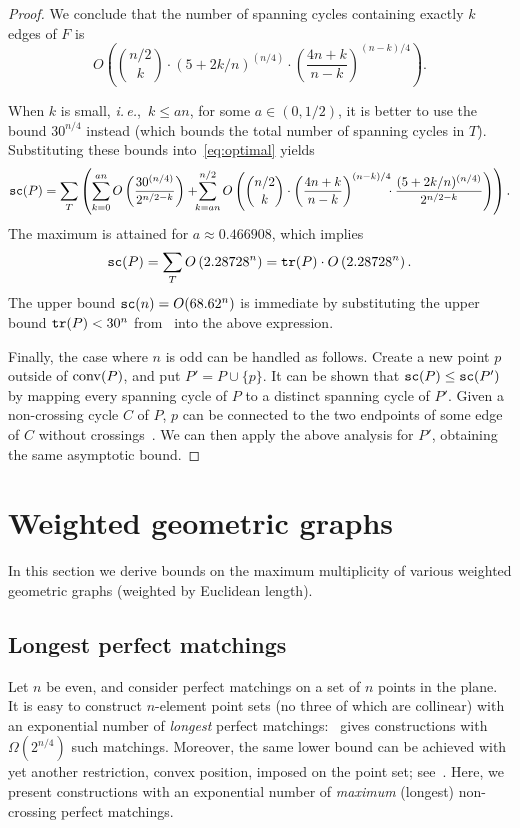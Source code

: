 \documentclass[11pt]{article}
\def\ie{{\it i.\,e.},~}
\newcommand{\conv}{{\rm conv}}
\def\tr{{\tt tr}}
\def\sc{{\tt sc}}
\def\ns{\hspace*{-1ex}}
\begin{document}
\begin{proof}
We conclude that the number of spanning cycles containing exactly $k$
edges of $F$ is
\begin{equation*} \label{eq:countK}
O \left(\binom{n/2}{k} \cdot (5+2k/n)^{(n/4)} \cdot \left(
\frac{4n+k}{n-k} \right)^{(n-k)/4} \right).
\end{equation*}

When $k$ is small, \ie $k \leq an$, for some $a \in (0,1/2)$, it is
better to use the bound $30^{n/4}$ instead
(which bounds the total number of spanning cycles in $T$).
Substituting these bounds into~\eqref{eq:optimal} yields
\[ \sc(P) = \sum_{T} \left( \sum_{k = 0}^{an} O \left(
\frac{30^{(n/4)}}{2^{n/2-k}}\right) + \ns  \sum_{k = an}^{n/2}O \left(
\binom{n/2}{k} \cdot \left( \frac{4n+k}{n-k} \right)^{(n-k)/4} \ns
\cdot  \frac{(5+2k/n)^{(n/4)}}{2^{n/2-k}} \right) \right). \]
The maximum is attained for $a \approx 0.466908$, which implies
\[ \sc(P) = \sum_{T} O\left(2.28728^n \right) = \tr(P) \cdot O\left(2.28728^n \right). \]
The upper bound $\sc(n) = O(68.62^n)$ is immediate by substituting
the upper bound $\tr(P)<30^n$ from~\cite{SS10} into the above expression.

Finally, the case where $n$ is odd can be handled as follows. Create a new point $p$
outside of $\conv(P)$, and put $P' = P \cup \{p\}$.
It can be shown that $\sc(P) \le \sc(P')$ by mapping every spanning cycle of $P$ to
a distinct spanning cycle of $P'$. Given a non-crossing cycle $C$ of $P$,
 $p$ can be connected to the two endpoints of some
edge of $C$ without crossings~\cite[Lemma~2.1]{HKRT08}. We can then apply the
above analysis for $P'$, obtaining the same asymptotic bound.
\end{proof}


\section {Weighted geometric graphs} \label{sec:weighted}
In this section we derive bounds on the maximum multiplicity of various weighted
geometric graphs (weighted by Euclidean length).

\subsection {Longest perfect matchings}
Let $n$ be even, and consider perfect matchings on a set of $n$
points in the plane. It is easy to construct $n$-element point sets
(no three of which are collinear) with an exponential number
of {\em longest} perfect matchings:~\cite{D02} gives constructions with
$\Omega(2^{n/4})$ such matchings.
Moreover, the same lower bound can be achieved with yet another restriction,
convex position, imposed on the point set; see~\cite{D02}.
Here, we present constructions with an exponential number of {\em maximum}
(longest) non-crossing perfect matchings.
\end{document}
